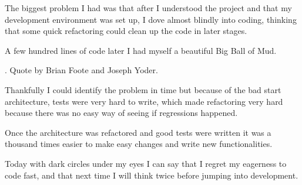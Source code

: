 \documentclass[12pt,a4paper]{scrartcl}
\begin{document}
The biggest problem I had was that after I understood the project and that my
development environment was set up, I dove almost blindly into coding, thinking
that some quick refactoring could clean up the code in later stages. 

A few hundred lines of code later I had myself a beautiful Big Ball of Mud.

. Quote by Brian Foote and Joseph Yoder.

Thankfully I could identify the problem in time but because of the bad start
architecture, tests were very hard to write, which made refactoring very hard
because there was no easy way of seeing if regressions happened.

Once the architecture was refactored and good tests were written it was a
thousand times easier to make easy changes and write new functionalities.

Today with dark circles under my eyes I can say that I regret my eagerness to
code fast, and that next time I will think twice before jumping into
development.
\end{document}
